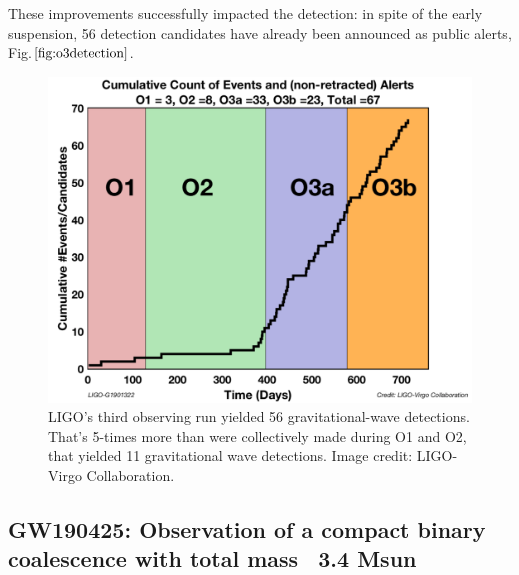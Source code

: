 \documentclass[binding=0.6cm, LaM]{sapthesis}
\begin{document}
	These improvements successfully impacted the detection: in spite of the early suspension, 
	56 detection candidates have already been announced as public alerts, Fig.$\ref{fig:o3detection}$.
                \begin{figure}[H]
                        \label{o3detection}
                        \includegraphics[scale=0.22]{o3detection}
                        \centering
                        \caption{LIGO's third observing run yielded 56 gravitational-wave detections. 
				      That's 5-times more than were collectively made during O1 and O2,  
				       that yielded 11 gravitational wave detections. Image credit: LIGO-Virgo Collaboration.
                                 } 
                        \label{fig:o3detection}
                \end{figure}

\subsection{GW190425: Observation of a compact binary coalescence with total mass ~3.4 Msun}
\end{document}
